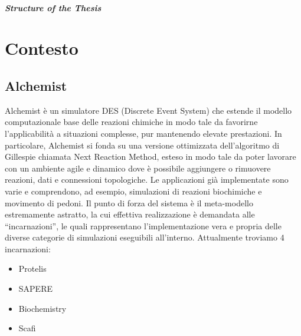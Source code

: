 \documentclass[12pt,a4paper,openright,twoside]{book}
\begin{document}
%
%
%

\paragraph{Structure of the Thesis}

\chapter{Contesto}

\section{Alchemist}
Alchemist\space\cite{Pianini_2013} è un simulatore DES (Discrete Event System) che estende il modello computazionale 
base delle reazioni chimiche in modo tale da favorirne l'applicabilità a situazioni complesse,
pur mantenendo elevate prestazioni. In particolare, Alchemist si fonda su una versione ottimizzata 
dell'algoritmo di Gillespie\cite{gillespie1977exact} chiamata Next Reaction Method\cite{gibson2000efficient}, esteso in modo tale da poter lavorare 
con un ambiente agile e dinamico dove è possibile aggiungere o rimuovere reazioni, dati e
connessioni topologiche. Le applicazioni già implementate sono varie e comprendono, ad esempio, 
simulazioni di reazioni biochimiche e movimento di pedoni. Il punto di forza del sistema è il 
meta-modello estremamente astratto, la cui effettiva realizzazione è demandata alle ``incarnazioni'',
le quali rappresentano l'implementazione vera e propria delle diverse categorie di simulazioni 
eseguibili all'interno. Attualmente troviamo 4 incarnazioni: 
\begin{itemize}
    \item Protelis
    \item SAPERE
    \item Biochemistry
    \item Scafi
\end{itemize}
\end{document}

